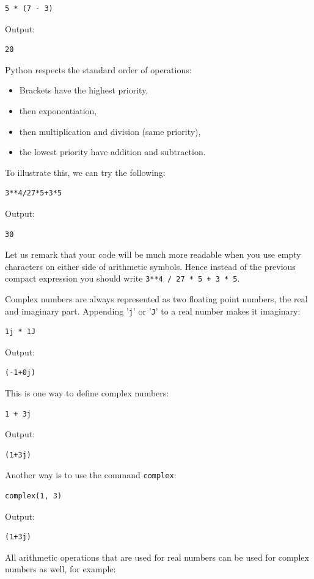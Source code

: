 \documentclass[article,A4,12pt]{llncs}
\begin{document}
\begin{verbatim}
5 * (7 - 3)
\end{verbatim}
Output:

\begin{verbatim}
20
\end{verbatim}
Python respects the standard order of operations:

\begin{itemize} 
\item Brackets have the highest priority, 
\item then exponentiation, 
\item then multiplication and division (same priority),
\item the lowest priority have addition and subtraction.
\end{itemize}
To illustrate this, we can try the following:

\begin{verbatim}
3**4/27*5+3*5
\end{verbatim}
Output:

\begin{verbatim}
30
\end{verbatim}
Let us remark that your code will be much more readable when you use empty
characters on either side of arithmetic symbols. Hence instead of the 
previous compact expression you should write {\tt 3**4 / 27 * 5 + 3 * 5}.

Complex numbers are always represented as two floating point numbers, the 
real and imaginary part. Appending '{\tt j}' or  '{\tt J}' to a real number
makes it imaginary:

\begin{verbatim}
1j * 1J
\end{verbatim}
Output:

\begin{verbatim}
(-1+0j)
\end{verbatim}
This is one way to define complex numbers:
\begin{verbatim}
1 + 3j
\end{verbatim}
Output:

\begin{verbatim}
(1+3j)
\end{verbatim}
Another way is to use the command {\tt complex}:

\begin{verbatim}
complex(1, 3)
\end{verbatim}
Output:

\begin{verbatim}
(1+3j)
\end{verbatim}
All arithmetic operations that are used for real numbers can be 
used for complex numbers as well, for example:
\end{document}
